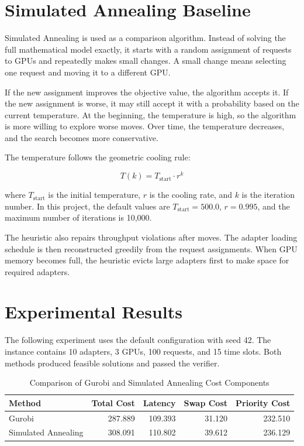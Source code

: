 \documentclass[12pt]{article}
\begin{document}
\section{Simulated Annealing Baseline}

Simulated Annealing is used as a comparison algorithm. Instead of solving the
full mathematical model exactly, it starts with a random assignment of requests
to GPUs and repeatedly makes small changes. A small change means selecting one
request and moving it to a different GPU.

If the new assignment improves the objective value, the algorithm accepts it.
If the new assignment is worse, it may still accept it with a probability based
on the current temperature. At the beginning, the temperature is high, so the
algorithm is more willing to explore worse moves. Over time, the temperature
decreases, and the search becomes more conservative.

The temperature follows the geometric cooling rule:

\[
T(k) = T_{\text{start}} \cdot r^k
\]

where $T_{\text{start}}$ is the initial temperature, $r$ is the cooling rate,
and $k$ is the iteration number. In this project, the default values are
$T_{\text{start}} = 500.0$, $r = 0.995$, and the maximum number of iterations
is 10,000.

The heuristic also repairs throughput violations after moves. The adapter
loading schedule is then reconstructed greedily from the request assignments.
When GPU memory becomes full, the heuristic evicts large adapters first to make
space for required adapters.

\section{Experimental Results}

The following experiment uses the default configuration with seed 42. The
instance contains 10 adapters, 3 GPUs, 100 requests, and 15 time slots. Both
methods produced feasible solutions and passed the verifier.

\begin{table}[h]
\centering
\caption{Comparison of Gurobi and Simulated Annealing Cost Components}
\begin{tabular}{lrrrr}
\toprule
Method & Total Cost & Latency & Swap Cost & Priority Cost \\
\midrule
Gurobi & 287.889 & 109.393 & 31.120 & 232.510 \\
Simulated Annealing & 308.091 & 110.802 & 39.612 & 236.129 \\
\bottomrule
\end{tabular}
\end{table}
\end{document}
